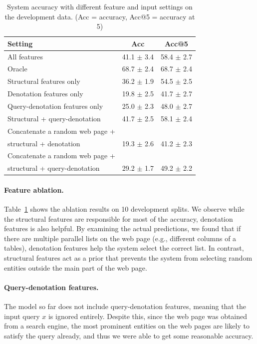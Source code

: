 \begin{table}[t]\centering
\begin{tabular}{lcc} \toprule
\textbf{Setting} & \textbf{Acc} & \textbf{Acc@5} \\ \midrule
All features & 41.1 $\pm$ 3.4 & 58.4 $\pm$ 2.7 \\
Oracle & 68.7 $\pm$ 2.4 & 68.7 $\pm$ 2.4 \\
\midrule
Structural features only & 36.2 $\pm$ 1.9 & 54.5 $\pm$ 2.5 \\
Denotation features only & 19.8 $\pm$ 2.5 & 41.7 $\pm$ 2.7 \\
\midrule
Query-denotation features only & 25.0 $\pm$ 2.3 & 48.0 $\pm$ 2.7 \\
Structural + query-denotation & 41.7 $\pm$ 2.5 & 58.1 $\pm$ 2.4 \\  \midrule
Concatenate a random web page + \\ \quad structural + denotation & 19.3 $\pm$ 2.6 & 41.2 $\pm$ 2.3 \\
Concatenate a random web page + \\ \quad structural + query-denotation & 29.2 $\pm$ 1.7 & 49.2 $\pm$ 2.2 \\
\bottomrule
\end{tabular}
\caption[
System accuracy with different feature and input settings on the development data.
]{System accuracy with different feature and input settings on the development data.
(Acc = accuracy, Acc@5 = accuracy at 5)}\label{tab:openweb-ablation}
\end{table}

\paragraph{Feature ablation.}
Table~\ref{tab:openweb-ablation}
shows the ablation results
on 10 development splits.
We observe while the structural features
are responsible for most of the accuracy,
denotation features is also helpful.
By examining the actual predictions,
we found that if there are multiple
parallel lists on the web page
(e.g., different columns of a tables),
denotation features help the system
select the correct list.
In contrast, structural features
act as a prior that
prevents the system from selecting
random entities outside the main part
of the web page.

\paragraph{Query-denotation features.}
The model so far does not include query-denotation features,
meaning that the input query $x$ is ignored entirely.
Despite this, since the web page
was obtained from a search engine,
the most prominent entities on the web pages
are likely to satisfy the query already,
and thus we were able to get some reasonable accuracy.

